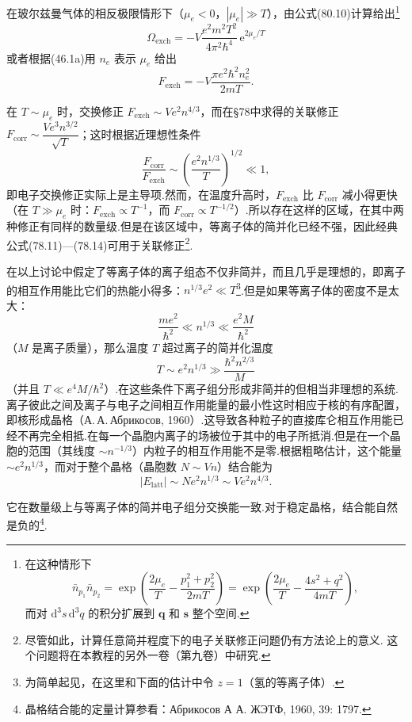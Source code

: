 在玻尔兹曼气体的相反极限情形下（$\mu_e<0$，$|\mu_e|\gg T$），由公式(80.10)计算给出\footnote{在这种情形下
\begin{equation*}
  \bar{n}_{p_1}\bar{n}_{p_2}
  =\exp\left(\frac{2\mu_e}{T}-\frac{p_1^2+p_2^2}{2mT}\right)
  =\exp\left(\frac{2\mu_e}{T}-\frac{4s^2+q^2}{4mT}\right),
\end{equation*}
而对 $\mathrm{d}^3s\,\mathrm{d}^3q$ 的积分扩展到 $\boldsymbol{q}$ 和 $\boldsymbol{s}$ 整个空间.}
\begin{equation}
  \Omega_{\mathrm{exch}}=-V\frac{e^2m^2T^2}{4\pi^2\hbar^4}\,
  \mathrm{e}^{2\mu_e/T}
\end{equation}
或者根据(46.1a)用 $n_e$ 表示 $\mu_e$ 给出
\begin{equation}
  F_{\mathrm{exch}}=-V\frac{\pi e^2\hbar^2n_e^2}{2mT}.
\end{equation}

在 $T\sim\mu_e$ 时，交换修正 $F_{\mathrm{exch}}\sim Ve^2n^{4/3}$，而在§78中求得的关联修正
$F_{\mathrm{corr}}\sim\dfrac{Ve^3n^{3/2}}{\sqrt{T}}$；这时根据近理想性条件
\begin{equation*}
  \frac{F_{\mathrm{corr}}}{F_{\mathrm{exch}}}
  \sim\left(\frac{e^2n^{1/3}}{T}\right)^{1/2}\ll1,
\end{equation*}
即电子交换修正实际上是主导项.然而，在温度升高时，$F_{\mathrm{exch}}$ 比 $F_{\mathrm{corr}}$ 减小得更快（在 $T\gg\mu_e$ 时：$F_{\mathrm{exch}}\propto T^{-1}$，而 $F_{\mathrm{corr}}\propto T^{-1/2}$）.所以存在这样的区域，在其中两种修正有同样的数量级.但是在该区域中，等离子体的简并化已经不强，因此经典公式(78.11)—(78.14)可用于关联修正\footnote{尽管如此，计算任意简并程度下的电子关联修正问题仍有方法论上的意义. 这个问题将在本教程的另外一卷（第九卷）中研究.}.

在以上讨论中假定了等离子体的离子组态不仅非简并，而且几乎是理想的，即离子的相互作用能比它们的热能小得多：$n^{1/3}e^2\ll T$\footnote{为简单起见，在这里和下面的估计中令 $z=1$（氢的等离子体）.}.但是如果等离子体的密度不是太大：
\begin{equation}
  \frac{me^2}{\hbar^2}\ll n^{1/3}\ll\frac{e^2M}{\hbar^2}
\end{equation}
（$M$ 是离子质量），那么温度 $T$ 超过离子的简并化温度
\begin{equation}
  T\sim e^2n^{1/3}\gg\frac{\hbar^2n^{2/3}}{M}
\end{equation}
（并且 $T\ll e^4M/\hbar^2$）.在这些条件下离子组分形成非简并的但相当非理想的系统.离子彼此之间及离子与电子之间相互作用能量的最小性这时相应于核的有序配置，即核形成晶格（А.\,А.\,Абрикосов, 1960）.这导致各种粒子的直接库仑相互作用能已经不再完全相抵.在每一个晶胞内离子的场被位于其中的电子所抵消.但是在一个晶胞的范围（其线度 $\sim n^{-1/3}$）内粒子的相互作用能不是零.根据粗略估计，这个能量 $\sim e^2n^{1/3}$，而对于整个晶格（晶胞数 $N\sim Vn$）结合能为
\begin{equation}
  \left|E_{\mathrm{latt}}\right|\sim Ne^2n^{1/3}\sim Ve^2n^{4/3}.
\end{equation}

它在数量级上与等离子体的简并电子组分交换能一致.对于稳定晶格，结合能自然是负的\footnote{晶格结合能的定量计算参看：Абрикосов А А. ЖЭТФ, 1960, 39: 1797.}.
